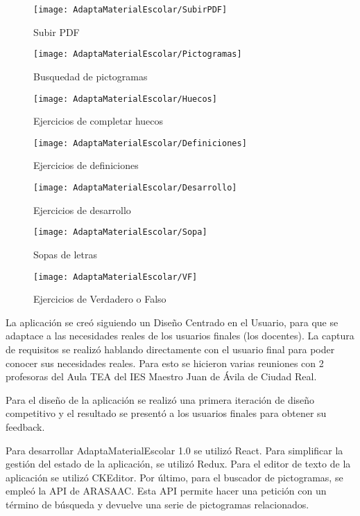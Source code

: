 \begin{figure}[ht!]
    \centering
    \texttt{[image:  AdaptaMaterialEscolar/SubirPDF]}
    \caption{Subir PDF}
    \label{SubirPDF}
\end{figure}
\begin{figure}[ht!]
    \centering
    \texttt{[image:  AdaptaMaterialEscolar/Pictogramas]}
    \caption{Busquedad de pictogramas}
    \label{Pictogramas}
\end{figure}
\begin{figure}[ht!]
    \centering
    \texttt{[image:  AdaptaMaterialEscolar/Huecos]}
    \caption{Ejercicios de completar huecos}
    \label{Huecos}
\end{figure}
\begin{figure}[ht!]
    \centering
    \texttt{[image:  AdaptaMaterialEscolar/Definiciones]}
    \caption{Ejercicios de definiciones}
    \label{Definiciones}
\end{figure}
\begin{figure}[ht!]
    \centering
    \texttt{[image:  AdaptaMaterialEscolar/Desarrollo]}
    \caption{Ejercicios de desarrollo}
    \label{Desarrollo}
\end{figure}
\begin{figure}[ht!]
    \centering
    \texttt{[image:  AdaptaMaterialEscolar/Sopa]}
    \caption{Sopas de letras}
    \label{Sopa}
\end{figure}
\begin{figure}[ht!]
    \centering
    \texttt{[image:  AdaptaMaterialEscolar/VF]}
    \caption{Ejercicios de Verdadero o Falso}
    \label{VF}
\end{figure}
La aplicación se creó siguiendo un Diseño Centrado en el Usuario, para que se adaptace a las necesidades reales de los usuarios finales (los docentes). La captura de requisitos se realizó hablando directamente con el usuario final para poder conocer sus necesidades reales. Para esto se hicieron varias reuniones con 2 profesoras del Aula TEA del IES Maestro Juan de Ávila de Ciudad Real.

Para el diseño de la aplicación se realizó una primera iteración de diseño competitivo y el resultado se presentó a los usuarios finales para obtener su feedback.

Para desarrollar AdaptaMaterialEscolar 1.0 se utilizó React. Para simplificar la gestión del estado de la aplicación, se utilizó Redux. Para el editor de texto de la aplicación se utilizó CKEditor. Por último, para el buscador de pictogramas, se empleó la API de ARASAAC. Esta API permite hacer una petición con un término de búsqueda y devuelve una serie de pictogramas relacionados.

